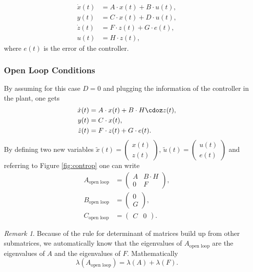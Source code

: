 \documentclass[a4paper,12 pt]{article}
\numberwithin{equation}{section}
\theoremstyle{definition}
\theoremstyle{remark}
\newtheorem*{bmk}{Remark}
\theoremstyle{definition}
\theoremstyle{definition}
\theoremstyle{definition}
\theoremstyle{remark}
\begin{document}
\begin{equation}
\begin{split}
\dot{x}(t)&=A\cdot x(t)+B\cdot u(t),\\
y(t)&=C\cdot x(t)+D\cdot u(t),\\
\dot{z}(t)&=F\cdot z(t)+G\cdot e(t),\\
u(t)&=H\cdot z(t),
\end{split}
\end{equation}
where $e(t)$ is the error of the controller.
\subsubsection*{Open Loop Conditions}
By assuming for this case $D=0$ and plugging the information of the controller in the plant, one gets
\begin{equation}
\begin{split}
\dot{x}(t)&=A\cdot x(t)+B\cdot H\cdoz z(t),\\
y(t)&=C\cdot x(t),\\
\dot{z}(t)&=F\cdot z(t)+G\cdot e(t).
\end{split}
\end{equation}
By defining two new variables $\tilde{x}(t)=\begin{pmatrix} x(t)\\z(t) \end{pmatrix}$, $\tilde{u}(t)=\begin{pmatrix} u(t)\\e(t) \end{pmatrix}$ and referring to Figure \ref{fig:controp} one can write
\begin{equation}
\begin{split}
A_{\text{open loop}}&=\begin{pmatrix} A & B\cdot H \\
0&F
\end{pmatrix},\\
B_{\text{open loop}}&=\begin{pmatrix} 0 \\
G
\end{pmatrix},\\
C_{\text{open loop}}&=\begin{pmatrix} C &0
\end{pmatrix}.
\end{split}
\end{equation}
\begin{bmk}
Because of the rule for determinant of matrices build up from other submatrices, we automatically know that the eigenvalues of $A_{\text{open loop}}$ are the eigenvalues of $A$ and the eigenvalues of $F$. Mathematically
\begin{equation}
\lambda (A_{\text{open loop}})=\lambda(A)+\lambda(F).
\end{equation}
\end{bmk}
\end{document}
